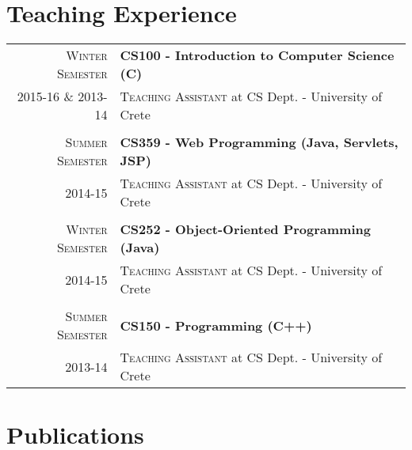\documentclass[11pt]{article}
\begin{document}
\section{Teaching Experience}

\begin{longtable}{r|p{12.5cm}}

\textsc{Winter Semester} & \textbf{CS100 - Introduction to Computer Science (C)}  \\
\textsc{2015-16 \& 2013-14} &\textsc{Teaching Assistant} at CS Dept. - University of Crete \\

\multicolumn{2}{c}{} \\
\textsc{Summer Semester} & \textbf{CS359 - Web Programming (Java, Servlets, JSP)}  \\
\textsc{2014-15} &\textsc{Teaching Assistant} at CS Dept. - University of Crete\\

\multicolumn{2}{c}{} \\
\textsc{Winter Semester} & \textbf{CS252 - Object-Oriented Programming (Java)}  \\
\textsc{2014-15} &\textsc{Teaching Assistant} at CS Dept. - University of Crete\\

\multicolumn{2}{c}{} \\
\textsc{Summer Semester} & \textbf{CS150 - Programming (C++)}  \\
\textsc{2013-14} &\textsc{Teaching Assistant} at CS Dept. - University of Crete\\

\end{longtable}

\section{Publications}
\end{document}
